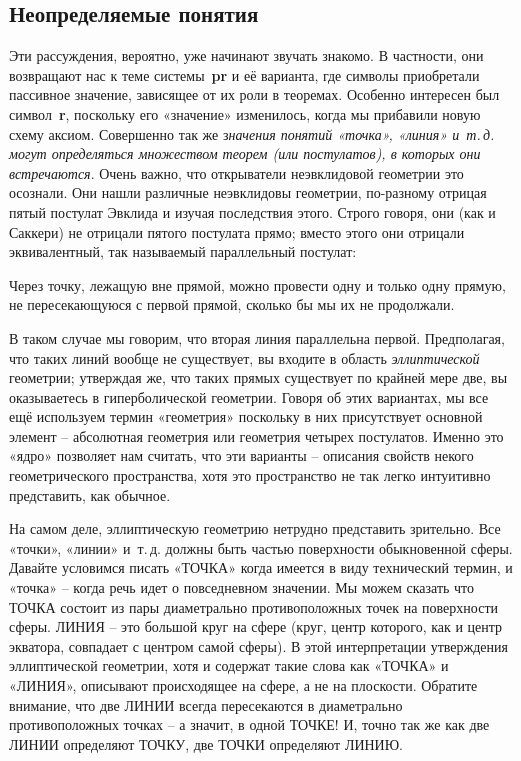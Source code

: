 \documentclass[../main.tex]{subfiles}
\begin{document}
\subsection{Неопределяемые понятия}

Эти рассуждения, вероятно, уже начинают звучать знакомо. В частности, они возвращают нас к теме системы~\textbf{pr} и её варианта, где символы приобретали пассивное значение, зависящее от их роли в теоремах. Особенно интересен был символ~\textbf{r}, поскольку его «значение» изменилось, когда мы прибавили новую схему аксиом. Совершенно так же з\emph{начения понятий «точка», «линия» и~т.\,д. могут определяться множеством теорем (или постулатов), в которых они встречаются}. Очень важно, что открыватели неэвклидовой геометрии это осознали. Они нашли различные неэвклидовы геометрии, по-разному отрицая пятый постулат Эвклида и изучая последствия этого. Строго говоря, они (как и Саккери) не отрицали пятого постулата прямо; вместо этого они отрицали эквивалентный, так называемый параллельный постулат:

Через точку, лежащую вне прямой, можно провести одну и только одну прямую, не пересекающуюся с первой прямой, сколько бы мы их не продолжали.

В таком случае мы говорим, что вторая линия параллельна первой. Предполагая, что таких линий вообще не существует, вы входите в область \emph{эллиптической} геометрии; утверждая же, что таких прямых существует по крайней мере две, вы оказываетесь в гиперболической геометрии. Говоря об этих вариантах, мы все ещё используем термин «геометрия» поскольку в них присутствует основной элемент \--- абсолютная геометрия или геометрия четырех постулатов. Именно это «ядро» позволяет нам считать, что эти варианты \--- описания свойств некого геометрического пространства, хотя это пространство не так легко интуитивно представить, как обычное.

На самом деле, эллиптическую геометрию нетрудно представить зрительно. Все «точки», «линии» и~т.\,д. должны быть частью поверхности обыкновенной сферы. Давайте условимся писать «ТОЧКА» когда имеется в виду технический термин, и «точка» \--- когда речь идет о повседневном значении. Мы можем сказать что ТОЧКА состоит из пары диаметрально противоположных точек на поверхности сферы. ЛИНИЯ \--- это большой круг на сфере (круг, центр которого, как и центр экватора, совпадает с центром самой сферы). В этой интерпретации утверждения эллиптической геометрии, хотя и содержат такие слова как «ТОЧКА» и «ЛИНИЯ», описывают происходящее на сфере, а не на плоскости. Обратите внимание, что две ЛИНИИ всегда пересекаются в диаметрально противоположных точках \--- а значит, в одной ТОЧКЕ! И, точно так же как две ЛИНИИ определяют ТОЧКУ, две ТОЧКИ определяют ЛИНИЮ\@.
\end{document}
